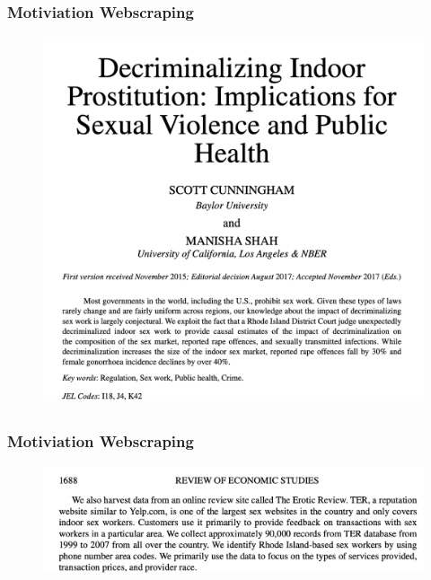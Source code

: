\documentclass[
  shownotes,
  xcolor={svgnames},
  hyperref={colorlinks,citecolor=DarkBlue,linkcolor=DarkRed,urlcolor=DarkBlue}
  , aspectratio=169]{beamer}
\begin{document}
\begin{frame}
\frametitle{Motiviation Webscraping}



\begin{figure}[H] \centering
  \centering
  \includegraphics[scale=0.25]{figures/Cunningham_title}
  \\
  \tiny
\end{figure}
 

\end{frame}


\begin{frame}
\frametitle{Motiviation Webscraping}



\begin{figure}[H] \centering
  \centering
  \includegraphics[scale=0.45]{figures/Cunningham_desc}
  \\
  \tiny
\end{figure}
 

\end{frame}
\end{document}
